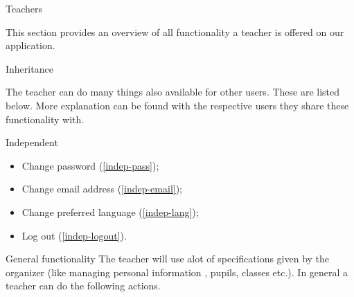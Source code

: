 
\begin{section}{Teachers}

    This section provides an overview of all functionality a teacher is offered
    on our application.

    \begin{subsection}{Inheritance}

        The teacher can do many things also available for other users. These are
        listed below. More explanation can be found with the respective users
        they share these functionality with.

        \begin{subsubsection}{Independent}

            \begin{itemize}
                \item Change password           (\ref{indep-pass});
                \item Change email address     (\ref{indep-email});
                \item Change preferred language (\ref{indep-lang});
                \item Log out                   (\ref{indep-logout}).
            \end{itemize}

        \end{subsubsection}

    \end{subsection}

    \begin{subsection}{General functionality}
	The teacher will use alot of specifications given by the organizer (like managing personal information
	, pupils, classes etc.). In general a teacher can do the following actions.\\


\end{subsection}
\end{section}
